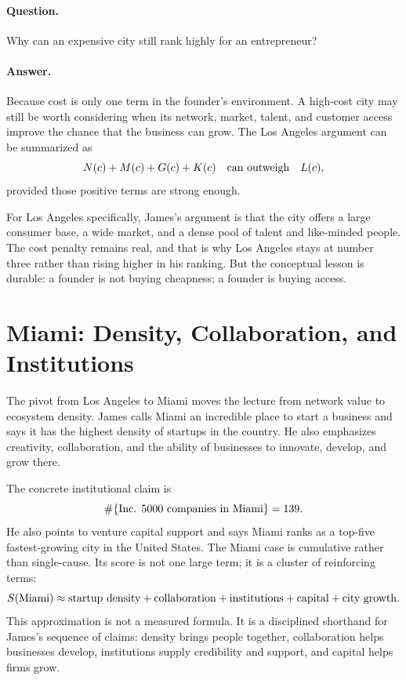 \paragraph{Question.}
Why can an expensive city still rank highly for an entrepreneur?

\paragraph{Answer.}
Because cost is only one term in the founder's environment. A high-cost city may still be worth considering when its network, market, talent, and customer access improve the chance that the business can grow. The Los Angeles argument can be summarized as
\begin{equation}
N(c)+M(c)+G(c)+K(c)
\quad \hbox{can outweigh} \quad
L(c),
\end{equation}
provided those positive terms are strong enough.

For Los Angeles specifically, James's argument is that the city offers a large consumer base, a wide market, and a dense pool of talent and like-minded people. The cost penalty remains real, and that is why Los Angeles stays at number three rather than rising higher in his ranking. But the conceptual lesson is durable: a founder is not buying cheapness; a founder is buying access.

\section{Miami: Density, Collaboration, and Institutions}

The pivot from Los Angeles to Miami moves the lecture from network value to ecosystem density. James calls Miami an incredible place to start a business and says it has the highest density of startups in the country. He also emphasizes creativity, collaboration, and the ability of businesses to innovate, develop, and grow there.

The concrete institutional claim is
\begin{equation}
\#\{\hbox{Inc. 5000 companies in Miami}\}=139.
\end{equation}
He also points to venture capital support and says Miami ranks as a top-five fastest-growing city in the United States. The Miami case is cumulative rather than single-cause. Its score is not one large term; it is a cluster of reinforcing terms:
\begin{equation}
S(\text{Miami})
\approx
\hbox{startup density}
+\hbox{collaboration}
+\hbox{institutions}
+\hbox{capital}
+\hbox{city growth}.
\end{equation}
This approximation is not a measured formula. It is a disciplined shorthand for James's sequence of claims: density brings people together, collaboration helps businesses develop, institutions supply credibility and support, and capital helps firms grow.

